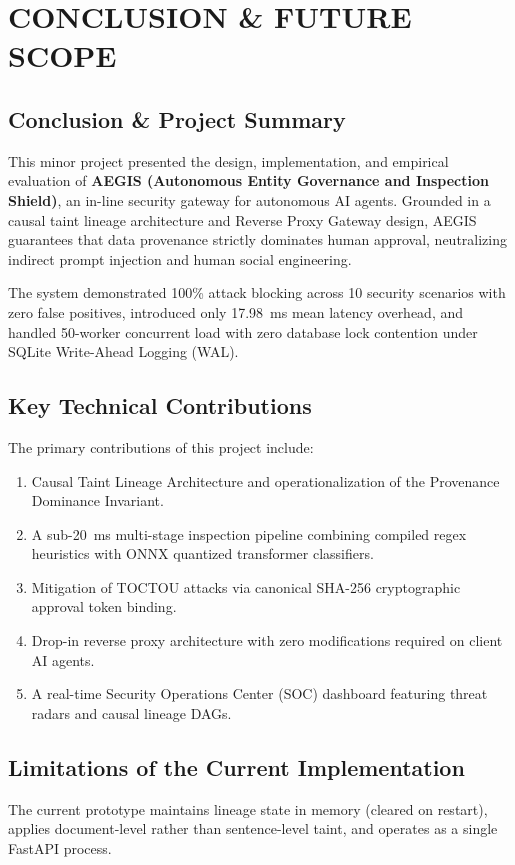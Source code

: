 \chapter{CONCLUSION \& FUTURE SCOPE}

\section{Conclusion \& Project Summary}
This minor project presented the design, implementation, and empirical evaluation of \textbf{AEGIS (Autonomous Entity Governance and Inspection Shield)}, an in-line security gateway for autonomous AI agents. Grounded in a causal taint lineage architecture and Reverse Proxy Gateway design, AEGIS guarantees that data provenance strictly dominates human approval, neutralizing indirect prompt injection and human social engineering.

The system demonstrated 100\% attack blocking across 10 security scenarios with zero false positives, introduced only 17.98~ms mean latency overhead, and handled 50-worker concurrent load with zero database lock contention under SQLite Write-Ahead Logging (WAL).

\section{Key Technical Contributions}
The primary contributions of this project include:
\begin{enumerate}
    \item Causal Taint Lineage Architecture and operationalization of the Provenance Dominance Invariant.
    \item A sub-20~ms multi-stage inspection pipeline combining compiled regex heuristics with ONNX quantized transformer classifiers.
    \item Mitigation of TOCTOU attacks via canonical SHA-256 cryptographic approval token binding.
    \item Drop-in reverse proxy architecture with zero modifications required on client AI agents.
    \item A real-time Security Operations Center (SOC) dashboard featuring threat radars and causal lineage DAGs.
\end{enumerate}

\section{Limitations of the Current Implementation}
The current prototype maintains lineage state in memory (cleared on restart), applies document-level rather than sentence-level taint, and operates as a single FastAPI process.

